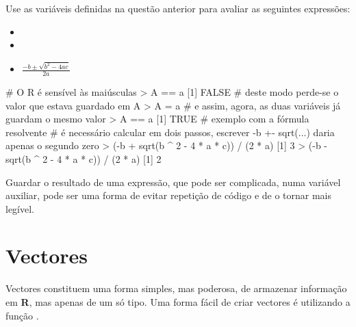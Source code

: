\documentclass{exam}
\begin{document}
\begin{questions}
\question Use as variáveis definidas na questão anterior para avaliar as seguintes expressões:
\begin{itemize}
	\item {}
	\item {}
	\item $\frac{-b \pm \sqrt{b^2 - 4ac}}{2a}$
\end{itemize}

\begin{solution}
	\begin{rcode}
		# O R é sensível às maiúsculas
		> A == a
		[1] FALSE
		# deste modo perde-se o valor que estava guardado em A
		> A = a
		# e assim, agora, as duas variáveis já guardam o mesmo valor
		> A == a
		[1] TRUE
		# exemplo com a fórmula resolvente
		# é necessário calcular em dois passos, escrever -b +- sqrt(...) daria apenas o segundo zero
		> (-b + sqrt(b ^ 2 - 4 * a * c)) / (2 * a)
		[1] 3
		> (-b - sqrt(b ^ 2 - 4 * a * c)) / (2 * a)
		[1] 2
	\end{rcode}
Guardar o resultado de uma expressão, que pode ser complicada, numa variável auxiliar, pode ser uma forma de evitar repetição de código e de o tornar mais legível.
\end{solution}

\end{questions}

\section{Vectores}

Vectores constituem uma forma simples, mas poderosa, de armazenar informação em \textbf{R}, mas apenas de um só tipo. Uma forma fácil de criar vectores é  utilizando a função .
\end{document}
